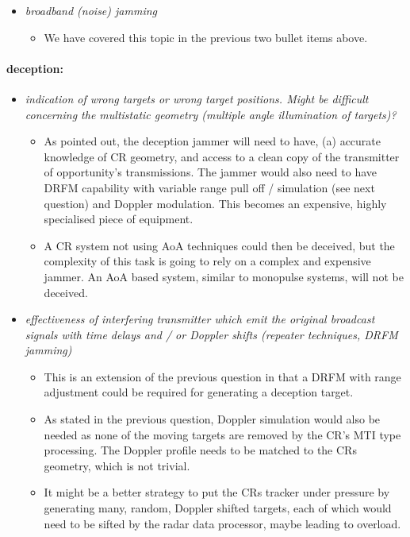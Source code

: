 \documentclass[english, 12pt]{report}
\begin{document}
\begin{itemize}
\item \emph{broadband (noise) jamming}
\begin{itemize}
\item  We have covered this topic in the previous two bullet items above.
\end{itemize}
\end{itemize}

\paragraph{deception:}


\begin{itemize}
\item \emph{indication of wrong targets or wrong target positions. Might be difficult concerning the multistatic geometry (multiple angle illumination of targets)?}
\begin{itemize}
\item As pointed out, the deception jammer will need to have, (a) accurate knowledge of CR geometry, and access to a clean copy of the transmitter of opportunity's transmissions. The jammer would also need to have DRFM capability with variable range pull off / simulation (see next question) and Doppler modulation. This becomes an expensive, highly specialised piece of equipment.
\item A CR system not using AoA techniques could then be deceived, but the complexity of this task is going to rely on a complex and expensive jammer. An AoA based system, similar to monopulse systems, will not be deceived.
\end{itemize}


\item \emph{effectiveness of interfering transmitter which emit the original broadcast signals with time delays and / or Doppler shifts (repeater techniques, DRFM jamming)}
\begin{itemize}
\item  This is an extension of the previous question in that a DRFM with range adjustment could be required for generating a deception target.
\item As stated in the previous question, Doppler simulation would also be needed as none of the moving targets are removed by the CR's MTI type processing. The Doppler profile needs to be matched to the CRs geometry, which is not trivial.
\item It might be a better strategy to put the CRs tracker under pressure by generating many, random, Doppler shifted targets, each of which would need to be sifted by the radar data processor, maybe leading to overload.
\end{itemize}



\end{itemize}
\end{document}
